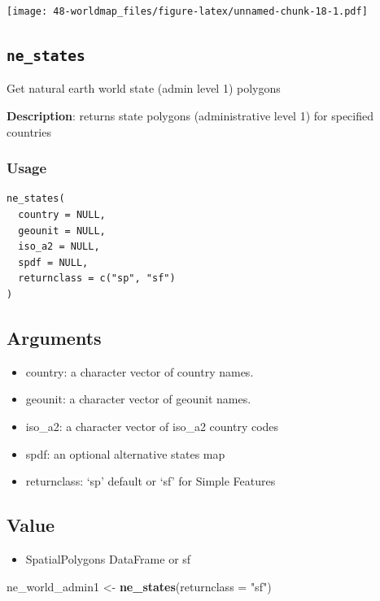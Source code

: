 \documentclass[
  xelatex, ja=standard]{bxjsbook}
\newenvironment{Shaded}{\begin{snugshade}}{\end{snugshade}}
\newcommand{\AttributeTok}[1]{\textcolor[rgb]{0.13,0.29,0.53}{#1}}
\newcommand{\FunctionTok}[1]{\textcolor[rgb]{0.13,0.29,0.53}{\textbf{#1}}}
\newcommand{\NormalTok}[1]{#1}
\newcommand{\OtherTok}[1]{\textcolor[rgb]{0.56,0.35,0.01}{#1}}
\newcommand{\StringTok}[1]{\textcolor[rgb]{0.31,0.60,0.02}{#1}}
\providecommand{\tightlist}{%
  \setlength{\itemsep}{0pt}\setlength{\parskip}{0pt}}
\theoremstyle{definition}
\theoremstyle{definition}
\theoremstyle{definition}
\theoremstyle{definition}
\theoremstyle{remark}
\begin{document}
\texttt{[image: 48-worldmap\_files/figure-latex/unnamed-chunk-18-1.pdf]}

\hypertarget{ne_states}{%
\subsection{\texorpdfstring{\texttt{ne\_states}}{ne\_states}}\label{ne_states}}

Get natural earth world state (admin level 1) polygons

\textbf{Description}: returns state polygons (administrative level 1) for specified countries

\hypertarget{usage}{%
\subsubsection{Usage}\label{usage}}

\begin{verbatim}
ne_states(
  country = NULL,
  geounit = NULL,
  iso_a2 = NULL,
  spdf = NULL,
  returnclass = c("sp", "sf")
)
\end{verbatim}

\hypertarget{arguments-1}{%
\subsection{Arguments}\label{arguments-1}}

\begin{itemize}
\item
  country: a character vector of country names.
\item
  geounit: a character vector of geounit names.
\item
  iso\_a2: a character vector of iso\_a2 country codes
\item
  spdf: an optional alternative states map
\item
  returnclass: `sp' default or `sf' for Simple Features
\end{itemize}

\hypertarget{value}{%
\subsection{Value}\label{value}}

\begin{itemize}
\tightlist
\item
  SpatialPolygons DataFrame or sf
\end{itemize}

\begin{Shaded}
\begin{Highlighting}[]
\NormalTok{ne\_world\_admin1 }\OtherTok{\textless{}{-}} \FunctionTok{ne\_states}\NormalTok{(}\AttributeTok{returnclass =} \StringTok{"sf"}\NormalTok{)}
\end{Highlighting}
\end{Shaded}
\end{document}
